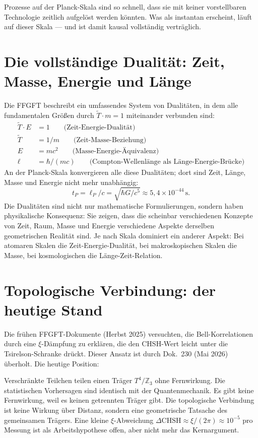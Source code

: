 Prozesse auf der Planck-Skala sind so schnell, dass sie mit keiner
vorstellbaren Technologie zeitlich aufgelöst werden könnten. Was als
instantan erscheint, läuft auf dieser Skala --- und ist damit kausal
vollständig verträglich.

\section{Die vollständige Dualität: Zeit, Masse, Energie und Länge}

Die FFGFT beschreibt ein umfassendes System von Dualitäten, in dem alle
fundamentalen Größen durch $\tilde T\cdot m = 1$ miteinander verbunden sind:
\begin{align}
  \tilde T\cdot E &= 1\qquad\text{(Zeit-Energie-Dualität)} \\
  \tilde T &= 1/m\qquad\text{(Zeit-Masse-Beziehung)} \\
  E &= mc^2\qquad\text{(Masse-Energie-Äquivalenz)} \\
  \ell &= \hbar/(mc)\qquad\text{(Compton-Wellenlänge als Länge-Energie-Brücke)}
\end{align}
An der Planck-Skala konvergieren alle diese Dualitäten; dort sind Zeit,
Länge, Masse und Energie nicht mehr unabhängig:
\begin{equation}
  t_P = \ell_P/c = \sqrt{\hbar G/c^5}\approx5{,}4\times10^{-44}\,\text{s}.
\end{equation}
Die Dualitäten sind nicht nur mathematische Formulierungen, sondern
haben physikalische Konsequenz: Sie zeigen, dass die scheinbar
verschiedenen Konzepte von Zeit, Raum, Masse und Energie verschiedene
Aspekte derselben geometrischen Realität sind. Je nach Skala dominiert
ein anderer Aspekt: Bei atomaren Skalen die Zeit-Energie-Dualität, bei
makroskopischen Skalen die Masse, bei kosmologischen die Länge-Zeit-Relation.

\section{Topologische Verbindung: der heutige Stand}

Die frühen FFGFT-Dokumente (Herbst 2025) versuchten, die Bell-Korrelationen
durch eine $\xi$-Dämpfung zu erklären, die den CHSH-Wert leicht unter
die Tsirelson-Schranke drückt. Dieser Ansatz ist durch Dok.~230 (Mai 2026)
überholt. Die heutige Position:

Verschränkte Teilchen teilen einen Träger $T^4/\mathbb{Z}_3$ ohne
Fernwirkung. Die statistischen Vorhersagen sind identisch mit der
Quantenmechanik. Es gibt keine Fernwirkung, weil es keinen
getrennten Träger gibt. Die topologische Verbindung ist keine
Wirkung über Distanz, sondern eine geometrische Tatsache des gemeinsamen
Trägers. Eine kleine $\xi$-Abweichung $\Delta\mathrm{CHSH}\approx
\xi/(2\pi)\approx10^{-5}$ pro Messung ist als Arbeitshypothese offen,
aber nicht mehr das Kernargument.

